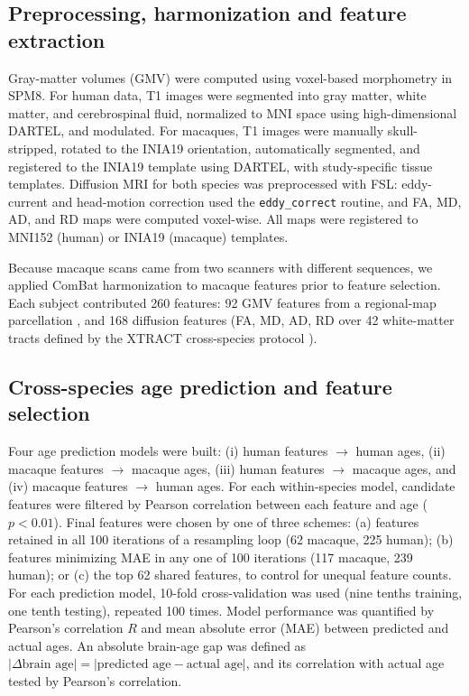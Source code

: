 \documentclass[11pt]{article}
\begin{document}
\subsection{Preprocessing, harmonization and feature extraction}

Gray-matter volumes (GMV) were computed using voxel-based morphometry in SPM8. For human data, T1 images were segmented into gray matter, white matter, and cerebrospinal fluid, normalized to MNI space using high-dimensional DARTEL, and modulated. For macaques, T1 images were manually skull-stripped, rotated to the INIA19 orientation, automatically segmented, and registered to the INIA19 template \citep{rohlfing2012inia19} using DARTEL, with study-specific tissue templates. Diffusion MRI for both species was preprocessed with FSL: eddy-current and head-motion correction used the \texttt{eddy\_correct} routine, and FA, MD, AD, and RD maps were computed voxel-wise. All maps were registered to MNI152 (human) or INIA19 (macaque) templates.

Because macaque scans came from two scanners with different sequences, we applied ComBat harmonization \citep{johnson2007adjusting, fortin2017harmonization_dti, fortin2017harmonization_thickness} to macaque features prior to feature selection. Each subject contributed 260 features: 92 GMV features from a regional-map parcellation \citep{bezgin2012hierarchical}, and 168 diffusion features (FA, MD, AD, RD over 42 white-matter tracts defined by the XTRACT cross-species protocol \citep{warrington2020xtract}).

\subsection{Cross-species age prediction and feature selection}

Four age prediction models were built: (i) human features $\rightarrow$ human ages, (ii) macaque features $\rightarrow$ macaque ages, (iii) human features $\rightarrow$ macaque ages, and (iv) macaque features $\rightarrow$ human ages. For each within-species model, candidate features were filtered by Pearson correlation between each feature and age ($p < 0.01$). Final features were chosen by one of three schemes: (a) features retained in all 100 iterations of a resampling loop (62 macaque, 225 human); (b) features minimizing MAE in any one of 100 iterations (117 macaque, 239 human); or (c) the top 62 shared features, to control for unequal feature counts. For each prediction model, 10-fold cross-validation was used (nine tenths training, one tenth testing), repeated 100 times. Model performance was quantified by Pearson's correlation $R$ and mean absolute error (MAE) between predicted and actual ages. An absolute brain-age gap was defined as $|\Delta\text{brain age}| = |\text{predicted age} - \text{actual age}|$, and its correlation with actual age tested by Pearson's correlation.
\end{document}
